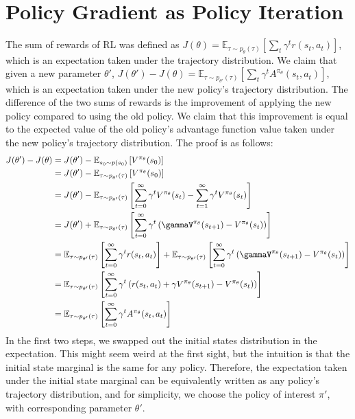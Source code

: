 \section{Policy Gradient as Policy Iteration}
The sum of rewards of RL was defined as $J(\theta) = \mathbb{E}_{\tau\sim p_\theta(\tau)}\left[\sum_t\gamma^tr(s_t,a_t)\right]$, which is an expectation taken under the trajectory distribution. We claim that given a new parameter $\theta'$, $J(\theta') - J(\theta) = \mathbb{E}_{\tau\sim p_{\theta'}(\tau)}\left[\sum_t\gamma^tA^{\pi_\theta}(s_t,a_t)\right]$, which is an expectation taken under the new policy's trajectory distribution. The difference of the two sums of rewards is the improvement of applying the new policy compared to using the old policy. We claim that this improvement is equal to the expected value of the old policy's advantage function value taken under the new policy's trajectory distribution. The proof is as follows:
\begin{align*}
    J(\theta') - J(\theta) &= J(\theta') - \mathbb{E}_{s_0\sim p(s_0)}\left[V^{\pi_\theta}(s_0)\right]\\
    &= J(\theta') - \mathbb{E}_{\tau\sim p_{\theta'}(\tau)}\left[V^{\pi_\theta}(s_0)\right]\\
    &= J(\theta') - \mathbb{E}_{\tau\sim p_{\theta'}(\tau)}\left[\sum_{t=0}^\infty\gamma^t V^{\pi_\theta}(s_t) - \sum_{t=1}^\infty\gamma^tV^{\pi_\theta}(s_t)\right]\\
    &= J(\theta') + \mathbb{E}_{\tau\sim p_{\theta'}(\tau)}\left[\sum_{t=0}^\infty\gamma^t\left(\gammaV^{\pi_\theta}(s_{t+1}) - V^{\pi_\theta}(s_t)\right)\right]\\
    &= \mathbb{E}_{\tau\sim p_{\theta'}(\tau)}\left[\sum_{t=0}^\infty\gamma^tr(s_t,a_t)\right] + \mathbb{E}_{\tau\sim p_{\theta'}(\tau)}\left[\sum_{t=0}^\infty\gamma^t\left(\gammaV^{\pi_\theta}(s_{t+1}) - V^{\pi_\theta}(s_t)\right)\right]\\
    &= \mathbb{E}_{\tau\sim p_{\theta'}(\tau)}\left[\sum_{t=0}^\infty\gamma^t\left(r(s_t,a_t) + \gamma V^{\pi_\theta}(s_{t+1})-V^{\pi_\theta}(s_t)\right)\right]\\
    &= \mathbb{E}_{\tau\sim p_{\theta'}(\tau)}\left[\sum_{t=0}^\infty\gamma^tA^{\pi_\theta}(s_t,a_t)\right]
\end{align*}
In the first two steps, we swapped out the initial states distribution in the expectation. This might seem weird at the first sight, but the intuition is that the initial state marginal is the same for any policy. Therefore, the expectation taken under the initial state marginal can be equivalently written as any policy's trajectory distribution, and for simplicity, we choose the policy of interest $\pi'$, with corresponding parameter $\theta'$.

